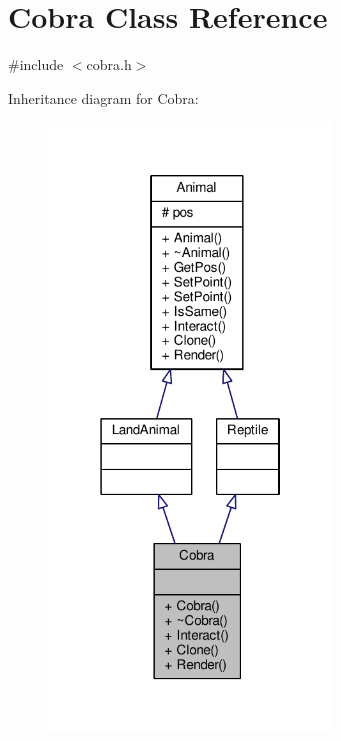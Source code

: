 \hypertarget{classCobra}{}\section{Cobra Class Reference}
\label{classCobra}


{\ttfamily \#include $<$cobra.\+h$>$}



Inheritance diagram for Cobra\+:
\nopagebreak
\begin{figure}[H]
\begin{center}
\leavevmode
\includegraphics[width=214pt]{classCobra__inherit__graph}
\end{center}
\end{figure}


